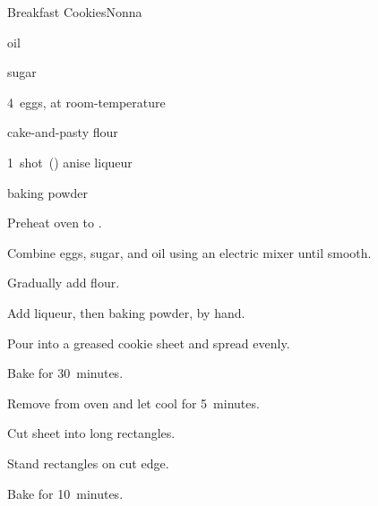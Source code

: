\begin{recipe}{Breakfast Cookies}{Nonna}{}

\begin{ingredients}
\item {} oil
\item {} sugar
\item 4~eggs, at room-temperature
\item {} cake-and-pasty flour
\item 1~shot~(\oz{1\half}) anise liqueur
\item {} baking powder
\end{ingredients}

\begin{directions}
\item Preheat oven to .
\item Combine eggs, sugar, and oil using an electric mixer until smooth.
\item Gradually add flour.
\item Add liqueur, then baking powder, by hand.
\item Pour into a greased cookie sheet and spread evenly.
\item Bake for 30~minutes.
\item Remove from oven and let cool for 5~minutes.
\item Cut sheet into long rectangles.
\item Stand rectangles on cut edge.
\item Bake for 10~minutes.
\end{directions}

\end{recipe}

